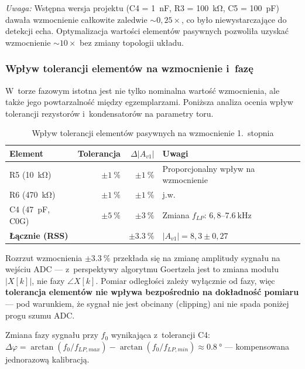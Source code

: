 \documentclass[a4paper,11pt]{article}
\begin{document}
	\textit{Uwaga:} Wstępna wersja projektu (C4 = \SI{1}{\nano\farad}, R3 = \SI{100}{\kilo\ohm},
	C5 = \SI{100}{\pico\farad}) dawała wzmocnienie całkowite zaledwie ${\sim}0{,}25\times$,
	co było niewystarczające do detekcji echa. Optymalizacja wartości elementów
	pasywnych pozwoliła uzyskać wzmocnienie ${\sim}10\times$ bez zmiany topologii
	układu.
	
	\subsubsection{Wpływ tolerancji elementów na wzmocnienie i~fazę}
	\label{sec:tolerancje}
	
	W~torze fazowym istotna jest nie tylko nominalna wartość wzmocnienia,
	ale także jego powtarzalność między egzemplarzami. Poniższa analiza
	ocenia wpływ tolerancji rezystorów i~kondensatorów na parametry toru.
	
	\begin{table}[H]
		\centering
		\caption{Wpływ tolerancji elementów pasywnych na wzmocnienie 1.~stopnia}
		\label{tab:tolerancje}
		\begin{tabularx}{\textwidth}{l r r X}
			\toprule
			\textbf{Element} & \textbf{Tolerancja} & \textbf{$\Delta |A_{v1}|$}
			& \textbf{Uwagi} \\
			\midrule
			R5 (\SI{10}{\kilo\ohm}) & $\pm\SI{1}{\percent}$ & $\pm\SI{1}{\percent}$
			& Proporcjonalny wpływ na wzmocnienie \\
			R6 (\SI{470}{\kilo\ohm}) & $\pm\SI{1}{\percent}$ & $\pm\SI{1}{\percent}$
			& j.w. \\
			C4 (\SI{47}{\pico\farad}, C0G) & $\pm\SI{5}{\percent}$ & $\pm\SI{3}{\percent}$
			& Zmiana $f_{LP}$: $6{,}8$--$\SI{7,6}{\kilo\hertz}$ \\
			\midrule
			\textbf{Łącznie (RSS)} & & $\pm\SI{3,3}{\percent}$ &
			$|A_{v1}| = 8{,}3 \pm 0{,}27$ \\
			\bottomrule
		\end{tabularx}
	\end{table}
	
	Rozrzut wzmocnienia $\pm\SI{3,3}{\percent}$ przekłada się na zmianę
	amplitudy sygnału na wejściu ADC --- z~perspektywy algorytmu Goertzela
	jest to zmiana modułu $|X[k]|$, nie fazy $\angle X[k]$. Pomiar odległości
	zależy wyłącznie od fazy, więc \textbf{tolerancja elementów nie wpływa
		bezpośrednio na dokładność pomiaru} --- pod warunkiem, że sygnał nie
	jest obcinany (clipping) ani nie spada poniżej progu szumu ADC.
	
	Zmiana fazy sygnału przy $f_0$ wynikająca z~tolerancji C4:
	$\Delta\varphi = \arctan(f_0/f_{LP,max}) - \arctan(f_0/f_{LP,min})
	\approx \SI{0,8}{\degree}$ --- kompensowana jednorazową kalibracją.
	
\end{document}
